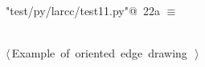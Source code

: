 \documentclass[11pt,oneside]{article}    %
\begin{document}
\begin{flushleft} \small \label{scrap35}
\protect{}\verb@"test/py/larcc/test11.py"@\nobreak\ {\footnotesize 22a }$\equiv$
\vspace{-1ex}
\begin{list}{}{} \item
\mbox{}\verb@@\\
\mbox{}\verb@@\hbox{$\langle\,$Example of oriented edge drawing\nobreak\ {\footnotesize {}}$\,\rangle$}\verb@@\\
\mbox{}\verb@@{\NWsep}
\end{list}
\vspace{-2ex}
\end{flushleft}
\end{document}

